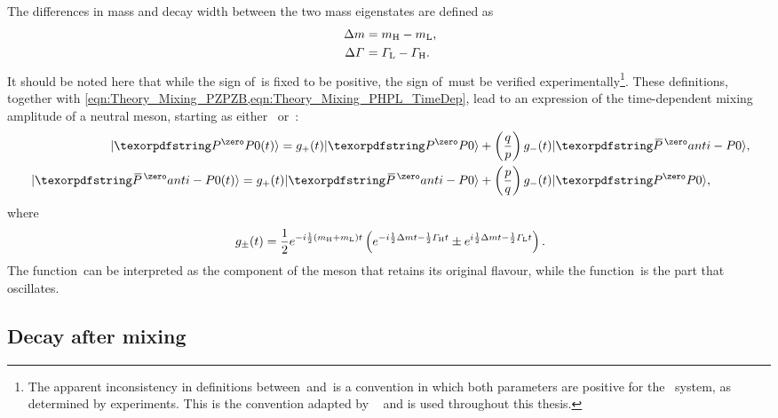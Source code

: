 The differences in mass and decay width between the two mass eigenstates are defined as
%
\begin{subequations}
    \begin{align}
        \dm &= \mH - \mL \rlap{,} \\
        \DG &= \GL - \GH \rlap{.}
    \end{align}
\end{subequations}
%
It should be noted here that while the sign of~\dm is fixed to be positive, the sign of~\DG must be verified experimentally\footnote{
    The apparent inconsistency in definitions between~\dm and~\DG is a convention in which both parameters are positive for the \Bs~system, as determined by experiments.
    This is the convention adapted by \hflav~\cite{HFLAV2016} and is used throughout this thesis.}.
These definitions, together with \cref{eqn:Theory_Mixing_PZPZB,eqn:Theory_Mixing_PHPL_TimeDep}, lead to an expression of the time-dependent mixing amplitude of a neutral meson, starting as either~\ket{\pz} or~\ket{\pzb}:
%
\begin{subequations} \label{eqn:Theory_Mixing_TimeDepMixingAmpl}
    \begin{align}
        \ket{\pz(t)}  = g_{+}(t) \ket{\pz}  &+ \left(\dfrac{q}{p}\right) g_{-}(t) \ket{\pzb} \rlap{,} \\
        \ket{\pzb(t)} = g_{+}(t) \ket{\pzb} &+ \left(\dfrac{p}{q}\right) g_{-}(t) \ket{\pz}  \rlap{,}
    \end{align}
\end{subequations}
%
where
%
\begin{equation} \label{eqn:Theory_Mixing_TimeDepMixingAmplG}
    g_{\pm}(t) = \dfrac{1}{2} e^{-i \frac{1}{2} (\mH + \mL) t} \left( e^{-i \frac{1}{2} \dm t - \frac{1}{2} \GH t} \pm e^{i \frac{1}{2} \dm t - \frac{1}{2} \GL t} \right) \rlap{.}
\end{equation}
%
The function~\gpt can be interpreted as the component of the meson that retains its original flavour, while the function~\gmt is the part that oscillates.

\clearpage
\subsection{Decay after mixing}

